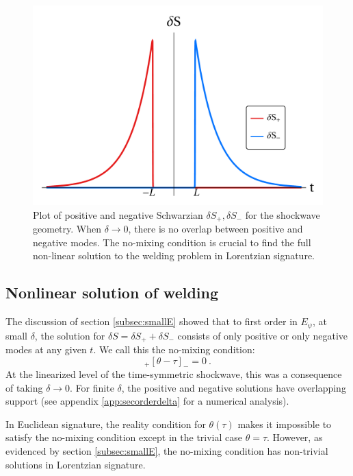 \documentclass[12pt]{article}
\newcommand{\be}{\begin{equation}}
\newcommand{\ee}{\end{equation}}
\def\be{\begin{eqnarray}}
\def\ee{\end{eqnarray}}
\def\be{\begin{equation}}
\def\ee{\end{equation}}
\numberwithin{equation}{section}
\def\be{\begin{equation}}
\def\ee{\end{equation}}
\def \be {\begin{equation}}
\def \ee {\end{equation}}
\begin{document}
\begin{spacing}{1.1}
\begin{figure}[h!]
\centering
\includegraphics[scale=0.3]{./figures/delta_to_zero.pdf}
\caption{Plot of positive and negative Schwarzian $\delta S_+, \delta S_-$ for the shockwave geometry. When $\delta \to0$, there is no overlap between positive and negative modes. The no-mixing condition is crucial to find the full non-linear solution to the welding problem in Lorentzian signature. \label{fig:delSchw}}
\end{figure}

\subsection{Nonlinear solution of welding }
The discussion of section \ref{subsec:smallE} showed that to first  order in $E_\psi$, at small $\delta$, the solution for $\delta S= \delta S_+ +\delta S_-$ consists of only positive or only negative modes at any given $t$. We call this the no-mixing condition: 
\be
[\theta - \tau]_+ [\theta-\tau]_- = 0 \ .
\ee 
At the linearized level of the time-symmetric shockwave, this was a consequence of taking $\delta \to 0$. For finite $\delta$, the positive and negative solutions have overlapping support (see appendix \ref{app:secorderdelta} for a numerical analysis). 

In Euclidean signature, the reality condition for $\theta(\tau)$ makes it impossible to satisfy the no-mixing condition except in the trivial case $\theta = \tau$. However, as evidenced by section \ref{subsec:smallE}, the no-mixing condition has non-trivial solutions in Lorentzian signature. 


\end{spacing}
\end{document}
